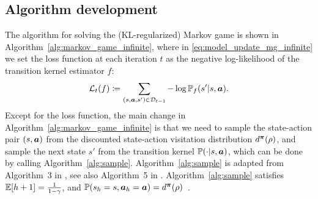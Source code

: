  


\subsection{Algorithm development}\label{sec:markov_alg_infinite}

The algorithm for solving the (KL-regularized) Markov game is shown in Algorithm~\ref{alg:markov_game_infinite}, where in \eqref{eq:model_update_mg_infinite} we set the loss function at each iteration $t$ as the negative log-likelihood of the transition kernel estimator $f$:
\begin{align}\label{eq:loss_mg_infinite}
    {\mathcal{L}}_t(f)\coloneqq \sum_{(s,{\bm{a}},s')\in{\mathcal{D}}_{t-1}}-\log {\mathbb P}_f(s'|s,{\bm{a}}).
\end{align}
Except for the loss function, the main change in Algorithm~\ref{alg:markov_game_infinite} is that we need to sample the state-action pair $(s,{\bm{a}})$ from the discounted state-action visitation distribution $d^{\bm{\pi}}(\rho)$, and sample the next state $s'$ from the transition kernel ${\mathbb P}(\cdot|s,{\bm{a}})$, which can be done by calling Algorithm~\ref{alg:sample}. Algorithm~\ref{alg:sample} is adapted from Algorithm~3 in \citet{yuan2023linear}, see also Algorithm~5 in \citet{yang2023federated}. Algorithm~\ref{alg:sample} satisfies $\mathbb{E}[h+1]=\frac{1}{1-\gamma}$, and ${\mathbb P}(s_h=s,{\bm{a}}_h={\bm{a}})=d^{\bm{\pi}}(\rho)$~\citep{yuan2023linear}.

